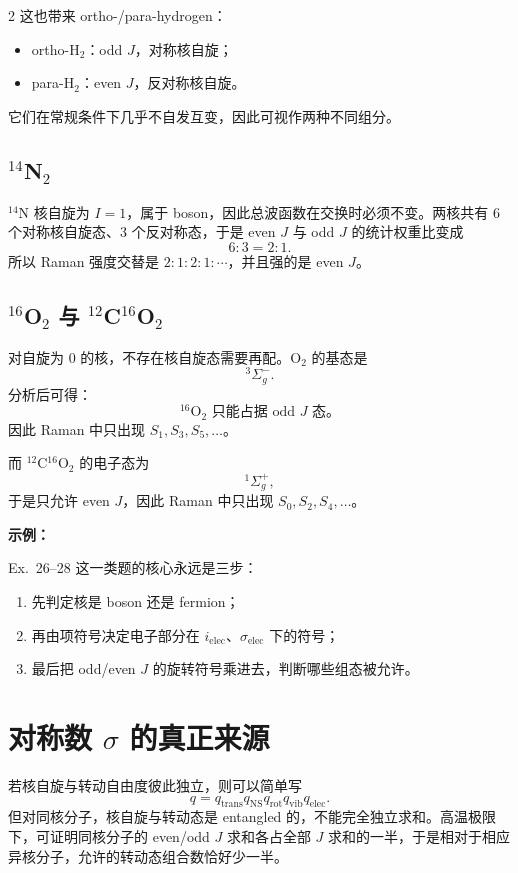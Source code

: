 \documentclass[a4paper,9pt]{article}
\newenvironment{examplebox}
{\par\vspace{0.3em}\noindent\begin{tcolorbox}[colback=boxbg,colframe=derivcolor,boxrule=0.5pt,arc=2pt,left=2pt,right=2pt,top=2pt,bottom=2pt,boxsep=0pt]\scriptsize\noindent\textcolor{derivcolor}{\textbf{示例：}}\par\setlength{\parskip}{0.1ex}\setlength{\itemsep}{0pt}\setlength{\parsep}{0pt}}
{\end{tcolorbox}\par\vspace{0.3em}}
\begin{document}
\begin{multicols}{2}
	这也带来 ortho-/para-hydrogen：
	\begin{itemize}
		\item ortho-H$_2$：odd $J$，对称核自旋；
		\item para-H$_2$：even $J$，反对称核自旋。
	\end{itemize}
	它们在常规条件下几乎不自发互变，因此可视作两种不同组分。

	\subsection{$^{14}$N$_2$}
	$^{14}$N 核自旋为 $I=1$，属于 boson，因此总波函数在交换时必须不变。两核共有 6 个对称核自旋态、3 个反对称态，于是 even $J$ 与 odd $J$ 的统计权重比变成
	\[
		6:3=2:1.
	\]
	所以 Raman 强度交替是 $2:1:2:1:\cdots$，并且强的是 even $J$。

	\subsection{$^{16}$O$_2$ 与 $^{12}$C$^{16}$O$_2$}
	对自旋为 0 的核，不存在核自旋态需要再配。O$_2$ 的基态是
	\[
		{}^3\Sigma_g^-.
	\]
	分析后可得：
	\[
		{}^{16}\mathrm O_2 \text{ 只能占据 odd }J\text{ 态。}
	\]
	因此 Raman 中只出现 $S_1,S_3,S_5,\dots$。

	而 $^{12}$C$^{16}$O$_2$ 的电子态为
	\[
		{}^1\Sigma_g^+,
	\]
	于是只允许 even $J$，因此 Raman 中只出现 $S_0,S_2,S_4,\dots$。

	\begin{examplebox}
		Ex.~26--28 这一类题的核心永远是三步：
		\begin{enumerate}
			\item 先判定核是 boson 还是 fermion；
			\item 再由项符号决定电子部分在 $i_{\mathrm{elec}}$、$\sigma_{\mathrm{elec}}$ 下的符号；
			\item 最后把 odd/even $J$ 的旋转符号乘进去，判断哪些组态被允许。
		\end{enumerate}
	\end{examplebox}

	\section{对称数 $\sigma$ 的真正来源}

	若核自旋与转动自由度彼此独立，则可以简单写
	\[
		q=q_{\mathrm{trans}}q_{\mathrm{NS}}q_{\mathrm{rot}}q_{\mathrm{vib}}q_{\mathrm{elec}}.
	\]
	但对同核分子，核自旋与转动态是 entangled 的，不能完全独立求和。高温极限下，可证明同核分子的 even/odd $J$ 求和各占全部 $J$ 求和的一半，于是相对于相应异核分子，允许的转动态组合数恰好少一半。


\end{multicols}
\end{document}
